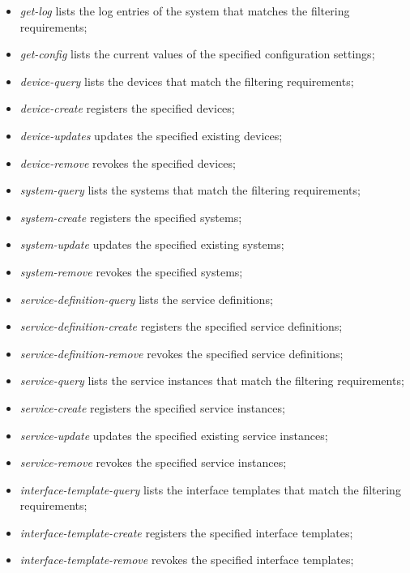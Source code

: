 \documentclass[a4paper]{arrowhead}
\begin{document}
\begin{itemize}
    \item \textit{get-log} lists the log entries of the system that matches the filtering requirements;
    \item \textit{get-config} lists the current values of the specified configuration settings;
    \item \textit{device-query} lists the devices that match the filtering requirements;
    \item \textit{device-create} registers the specified devices;
    \item \textit{device-updates} updates the specified existing devices;
    \item \textit{device-remove} revokes the specified devices;
    \item \textit{system-query} lists the systems that match the filtering requirements;
    \item \textit{system-create} registers the specified systems;
    \item \textit{system-update} updates the specified existing systems;
    \item \textit{system-remove} revokes the specified systems;
    \item \textit{service-definition-query} lists the service definitions;
    \item \textit{service-definition-create} registers the specified service definitions;
    \item \textit{service-definition-remove} revokes the specified service definitions;
    \item \textit{service-query} lists the service instances that match the filtering requirements;
    \item \textit{service-create} registers the specified service instances;
    \item \textit{service-update} updates the specified existing service instances;
    \item \textit{service-remove} revokes the specified service instances;
    \item \textit{interface-template-query} lists the interface templates that match the filtering requirements;
    \item \textit{interface-template-create} registers the specified interface templates;
    \item \textit{interface-template-remove} revokes the specified interface templates;
    
\end{itemize}
\end{document}
